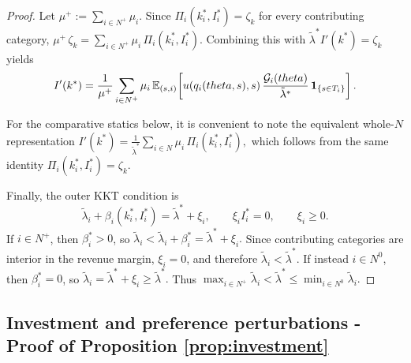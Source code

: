 \documentclass{class}
\begin{document}
\begin{proof}
Let
$\mu^+ := \sum_{i\in N^+}\mu_i.$
Since $\Pi_i(k_i^\ast,I_i^\ast)=\zeta_k$ for every contributing category,
$\mu^+\,\zeta_k = \sum_{i\in N^+}\mu_i\,\Pi_i(k_i^\ast,I_i^\ast).$
Combining this with $\tilde\lambda^\ast I'(k^\ast)=\zeta_k$ yields
\[
I'(k^\ast)
=
\frac{1}{\mu^+}
\sum_{i\in N^+}\mu_i\,
\mathbb{E}_{(s,i)}\!\left[
u(q_i(theta,s),s)\,
\frac{\mathcal{G}_i(theta)}{\tilde\lambda^\ast}\,
\mathbf 1_{\{s\in T_i\}}
\right].
\]

For the comparative statics below, it is convenient to note the equivalent whole-$N$ representation
$I'(k^\ast) = \frac{1}{\tilde\lambda^\ast} \sum_{i\in N}\mu_i\,\Pi_i(k_i^\ast,I_i^\ast),$
which follows from the same identity $\Pi_i(k_i^\ast,I_i^\ast)=\zeta_k$.

Finally, the outer KKT condition is
\[
\tilde\lambda_i+\beta_i(k_i^\ast,I_i^\ast)=\tilde\lambda^\ast+\xi_i,
\qquad
\xi_i I_i^\ast=0,
\qquad
\xi_i\geq 0.
\]
If $i\in N^+$, then $\beta_i^\ast>0$, so
$\tilde\lambda_i<\tilde\lambda_i+\beta_i^\ast=\tilde\lambda^\ast+\xi_i.$
Since contributing categories are interior in the revenue margin, $\xi_i=0$, and therefore
$\tilde\lambda_i<\tilde\lambda^\ast.$
If instead $i\in N^0$, then $\beta_i^\ast=0$, so
$\tilde\lambda_i=\tilde\lambda^\ast+\xi_i\geq \tilde\lambda^\ast.$
Thus
$\max_{i\in N^+}\tilde\lambda_i < \tilde\lambda^\ast \leq \min_{i\in N^0}\tilde\lambda_i. $\qedhere
\end{proof}
\subsection{Investment and preference perturbations - Proof of Proposition \ref{prop:investment}}\label{proof:propinvestment}
\end{document}
